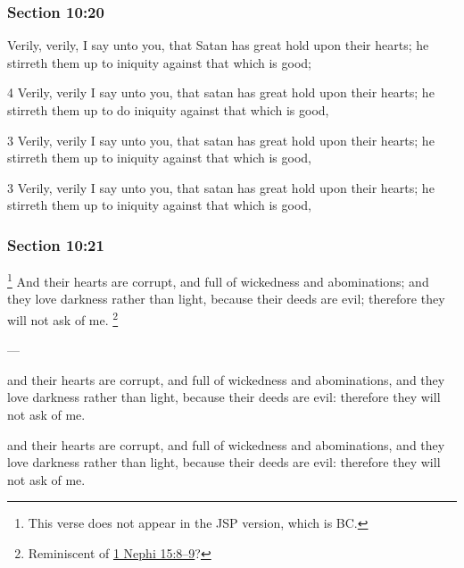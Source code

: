 	\subsubsection{Section 10:20} %
		\label{DC10-20}

		Verily, verily, I say unto you, that Satan has great hold upon their hearts; he stirreth them up to iniquity against that which is good;

		\begin{framed}
		\scriptsize
			\begin{compactdesc}
				\item[JSP] 4 Verily, verily I say unto you, that satan has great hold upon their hearts; he stirreth them up to do iniquity against that which is good,
				\item[RB1] [\textit{missing}] 
				\item[DC 1835] 3 Verily, verily I say unto you, that satan has great hold upon their hearts; he stirreth them up to iniquity against that which is good,
				\item[DC 1844] 3 Verily, verily I say unto you, that satan has great hold upon their hearts; he stirreth them up to iniquity against that which is good, 
			\end{compactdesc}
		\end{framed}

	\subsubsection{Section 10:21} %
		\label{DC10-21}

			\footnote{%
				This verse does not appear in the JSP version, which is BC.
				}%
		And their hearts are corrupt, and full of wickedness and abominations; and they love darkness rather than light, because their deeds are evil; therefore they will not ask of me.%
			\footnote{%
				Reminiscent of \hyperref[1NEPHI-15-8]{1 Nephi 15:8--9}?
				}

		\begin{framed}
		\scriptsize
			\begin{compactdesc}
				\item[JSP] ---
				\item[RB1] [\textit{missing}] 
				\item[DC 1835] and their hearts are corrupt, and full of wickedness and abominations, and they love darkness rather than light, because their deeds are evil: therefore they will not ask of me.
				\item[DC 1844] and their hearts are corrupt, and full of wickedness and abominations, and they love darkness rather than light, because their deeds are evil: therefore they will not ask of me. 
			\end{compactdesc}
		\end{framed}

